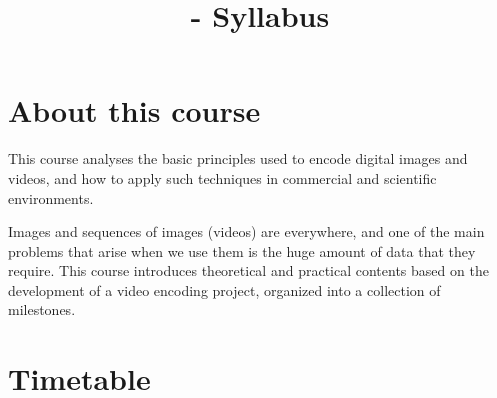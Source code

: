 
\title{\SM - Syllabus}

\maketitle

\section{About this course}

This course analyses the basic principles used to encode digital
images and videos, and how to apply such techniques in commercial and
scientific environments.

Images and sequences of images (videos) are everywhere, and one of the
main problems that arise when we use them is the huge amount of data
that they require. This course introduces theoretical and practical
contents based on the development of a video encoding project,
organized into a collection of milestones.

\section{Timetable}


